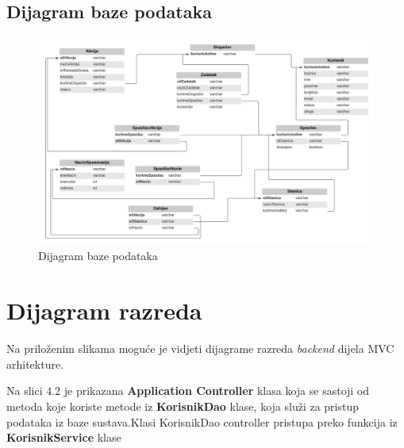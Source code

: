		\subsection{Dijagram baze podataka}
		\begin{figure}[h!]
			\centering
			\includegraphics[width=\textwidth]{./slike/dijagrambaze.png}
			\caption{Dijagram baze podataka}
			
		\end{figure}
		
		\eject
	
	
	\section{Dijagram razreda\\}
	
	
	{Na priloženim slikama moguće je vidjeti dijagrame razreda \textit{backend} dijela MVC \\arhitekture.\\}
	
	
	{Na slici 4.2 je prikazana \textbf{Application Controller} klasa  koja se sastoji od metoda koje koriste metode iz \textbf{KorisnikDao}  klase, koja  služi za pristup podataka iz baze sustava.Klasi KorisnikDao controller  pristupa preko funkcija iz \textbf{KorisnikService} klase}\\
	
